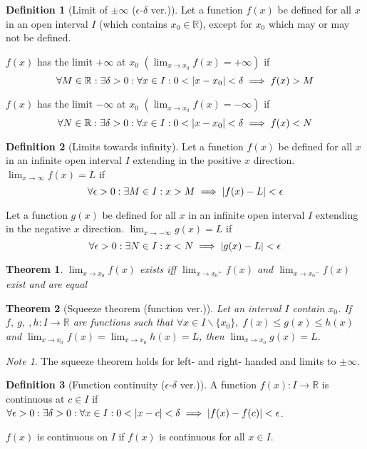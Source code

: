 \documentclass{article}
\theoremstyle{plain}
\newtheorem{theorem}{Theorem}[section]
\numberwithin{theorem}{section}
\theoremstyle{definition}
\newtheorem{definition}{Definition}[section]
\numberwithin{definition}{section}
\theoremstyle{remark}
\newtheorem{note}{Note}[section]
\numberwithin{note}{section}
\newcommand*{\R}{\mathbb{R}}
\begin{document}
%
\begin{definition}[Limit of $\pm\infty$ ($\epsilon$-$\delta$ ver.)]
    Let a function $f(x)$ be defined for all $x$ in an open interval $I$
    (which contains $x_0 \in \R$), except for $x_0$ which may or may not be defined.

    $f(x)$ has the limit $+\infty$ at $x_0$
    \(\left(\displaystyle\lim_{x\to x_0} f(x) = +\infty\right)\) if
    \[ \forall M \in \R: \exists\delta>0: \forall x \in I: 0<\abs{x-x_0}<\delta
    \implies f(x) > M \]

    $f(x)$ has the limit $-\infty$ at $x_0$
    \(\left(\displaystyle\lim_{x\to x_0} f(x) = -\infty\right)\) if
        \[ \forall N \in \R: \exists\delta>0: \forall x \in I: 0<\abs{x-x_0}<\delta
            \implies f(x) < N \]
\end{definition}
%
\begin{definition}[Limits towards infinity]
    Let a function $f(x)$ be defined for all $x$ in an infinite open interval $I$
    extending in the positive $x$ direction.
    $\displaystyle \lim_{x\to\infty} f(x) = L$ if
    \[ \forall \epsilon>0: \exists M \in I: x>M
        \implies \abs{f(x)-L}<\epsilon \]

    Let a function $g(x)$ be defined for all $x$ in an infinite open interval $I$
    extending in the negative $x$ direction.
    $\displaystyle \lim_{x\to-\infty} g(x) = L$ if
    \[ \forall \epsilon>0: \exists N \in I: x<N
        \implies \abs{g(x)-L}<\epsilon \]
\end{definition}
%
\begin{theorem}
    $\displaystyle\lim_{x\to x_0} f(x)$ exists iff
    $\displaystyle\lim_{x\to {x_0}^+} f(x)$ and $\displaystyle\lim_{x\to {x_0}^-} f(x)$
    exist and are equal
\end{theorem}
%
\begin{theorem}[Squeeze theorem (function ver.)]
    Let an interval $I$ contain $x_0$.
    If $f,\:g,\:,h : I \to \R$ are functions such that
    $\forall x \in I\backslash\{x_0\},\; f(x)\le g(x)\le h(x)$
    and
    $\displaystyle\lim_{x\to x_0} f(x) = \lim_{x\to x_0} h(x) = L$,
    then
    $\displaystyle\lim_{x\to x_0} g(x) = L$.
\end{theorem}
%
\begin{note}
   The squeeze theorem holds for left- and right- handed and limits to $\pm\infty$.
\end{note}
%
\begin{definition}[Function continuity ($\epsilon$-$\delta$ ver.)]
    A function $f(x):I\to\R$ is continuous at $c \in I$ if
    $\forall\epsilon>0: \exists\delta>0: \forall x\in I:
        0<\abs{x-c}<\delta \implies \abs{f(x)-f(c)}<\epsilon$.

    $f(x)$ is continuous on $I$ if $f(x)$ is continuous for all $x \in I$.
\end{definition}
\end{document}
